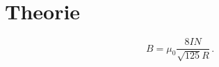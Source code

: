 \section{Theorie}
\label{sec:Theorie}

\cite{sample}

\begin{equation}
    B = \mu_0 \frac{8IN}{\sqrt{125}R}\,.
    \label{eqn:helm}
\end{equation}
